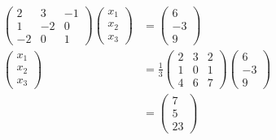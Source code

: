 \documentclass{article}
\begin{document}
\subsubsection{}

\begin{align*}
  \begin{pmatrix}
    2  & 3  & -1 \\
    1  & -2 & 0  \\
    -2 & 0  & 1
  \end{pmatrix} \begin{pmatrix}
                  x_1 \\
                  x_2 \\
                  x_3
                \end{pmatrix} & = \begin{pmatrix}
                                    6  \\
                                    -3 \\
                                    9
                                  \end{pmatrix}                           \\
  \begin{pmatrix}
    x_1 \\
    x_2 \\
    x_3
  \end{pmatrix}               & = \frac{1}{3} \begin{pmatrix}
                                                2 & 3 & 2 \\
                                                1 & 0 & 1 \\
                                                4 & 6 & 7
                                              \end{pmatrix} \begin{pmatrix}
                                                              6  \\
                                                              -3 \\
                                                              9
                                                            \end{pmatrix} \\
                                & = \begin{pmatrix}
                                      7 \\
                                      5 \\
                                      23
                                    \end{pmatrix}
\end{align*}
\end{document}
